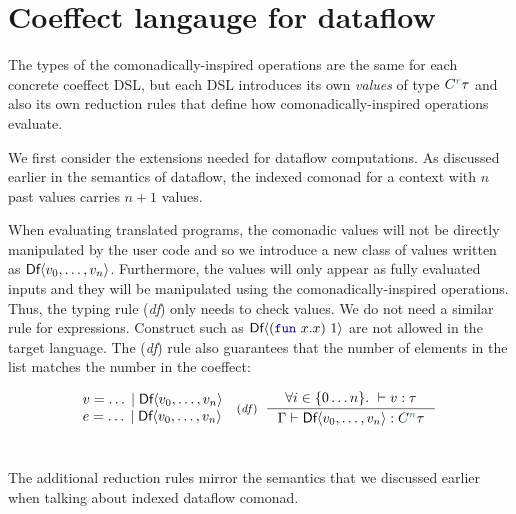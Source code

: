 
\section{Coeffect langauge for dataflow}

The types of the comonadically-inspired operations are the same for each concrete coeffect DSL, but
each DSL introduces its own \emph{values} of type $\ctyp{\cclrd{r}}\tau$ and also its own reduction
rules that define how comonadically-inspired operations evaluate.

We first consider the extensions needed for dataflow computations. As discussed earlier in the
semantics of dataflow, the indexed comonad for a context with $n$ past values carries $n+1$ 
values.

When evaluating translated programs, the comonadic values will not be directly manipulated by the
user code and so we introduce a new class of values written as $\textnormal{\sffamily Df}\langle v_0, \ldots, v_n\rangle$. 
Furthermore, the  values will only appear as fully evaluated inputs and they will be manipulated 
using the comonadically-inspired operations. Thus, the typing rule (\emph{df}) only needs to 
check values. We do not need a similar rule for expressions. Construct such as $\ident{Df}\langle(\kvd{fun}~x.x)~1\rangle$ 
are not allowed in the target language. The (\emph{df}) rule also guarantees that the number of 
elements in the list matches the number in the coeffect:

\begin{equation*}
\begin{array}{l}
v = \ldots \sep \ident{Df}\langle v_0, \ldots, v_n\rangle \\
e = \ldots \sep \ident{Df}\langle v_0, \ldots, v_n\rangle \\
\end{array}  
\begin{array}{l}
\tyrule{df}
  { \forall i\in\{ 0 \ldots n \}. ~ \vdash v : \tau}
  { \Gamma \vdash \ident{Df}\langle v_0, \ldots, v_n \rangle : \ctyp{\cclrd{n}}{\tau} }
\end{array}  
\end{equation*}
~

\noindent
The additional reduction rules mirror the semantics that we discussed earlier when talking about
indexed dataflow comonad.


